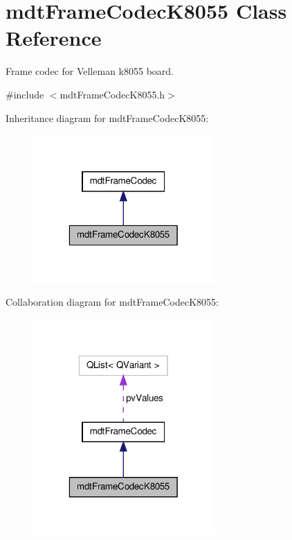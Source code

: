 \hypertarget{classmdt_frame_codec_k8055}{\section{mdt\-Frame\-Codec\-K8055 Class Reference}
\label{classmdt_frame_codec_k8055}
}


Frame codec for Velleman k8055 board.  




{\ttfamily \#include $<$mdt\-Frame\-Codec\-K8055.\-h$>$}



Inheritance diagram for mdt\-Frame\-Codec\-K8055\-:
\nopagebreak
\begin{figure}[H]
\begin{center}
\leavevmode
\includegraphics[width=196pt]{classmdt_frame_codec_k8055__inherit__graph}
\end{center}
\end{figure}


Collaboration diagram for mdt\-Frame\-Codec\-K8055\-:
\nopagebreak
\begin{figure}[H]
\begin{center}
\leavevmode
\includegraphics[width=196pt]{classmdt_frame_codec_k8055__coll__graph}
\end{center}
\end{figure}
